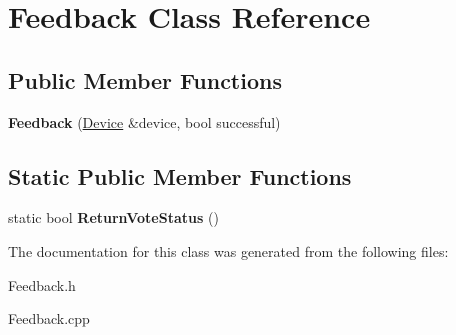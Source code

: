 \hypertarget{classFeedback}{}\section{Feedback Class Reference}
\label{classFeedback}
\subsection*{Public Member Functions}
\begin{DoxyCompactItemize}
\item 
\mbox{\label{classFeedback_ac80ed1bfec6114cd174fcdbb91974ffe}} 
{\bfseries Feedback} (\hyperlink{classDevice}{Device} \&device, bool successful)
\end{DoxyCompactItemize}
\subsection*{Static Public Member Functions}
\begin{DoxyCompactItemize}
\item 
\mbox{\label{classFeedback_a9084f56709864534e1ee7e9c718bef45}} 
static bool {\bfseries Return\+Vote\+Status} ()
\end{DoxyCompactItemize}


The documentation for this class was generated from the following files\+:\begin{DoxyCompactItemize}
\item 
Feedback.\+h\item 
Feedback.\+cpp\end{DoxyCompactItemize}

